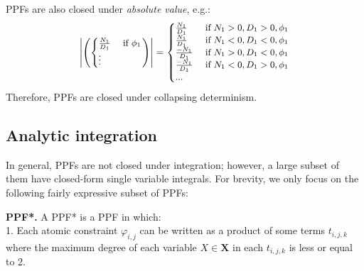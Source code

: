 \documentclass[]{article}
\newcommand{\bvec}[1]{\textbf{#1}}
\newcommand{\case}[2]{#2 &\text{ if } #1}%
\begin{document}
PPFs are also closed under \emph{absolute value}, e.g.:
\begin{equation*}\footnotesize
\left|
\left(
  \begin{cases}
  \case{\phi_1}{\frac{N_1}{D_1}}\\
  \vdots
  \end{cases}
\right)
\right|
=
  \begin{cases}
  \case{N_1>0, D_1>0,\phi_1}{\frac{N_1}{D_1}} \\
\case{N_1<0, D_1<0,\phi_1}{\frac{N_1}{D_1}} \\
\case{N_1>0, D_1<0,\phi_1}{\frac{-N_1}{D_1}} \\
\case{N_1<0, D_1>0,\phi_1}{\frac{-N_1}{D_1}} \\
...
 \end{cases}
\end{equation*}
Therefore, %
PPFs are closed under %
collapsing determinism. %


\subsection{Analytic integration}
In general, PPFs are not closed under integration; however, a large subset of them 
 have closed-form single variable integrals.
For brevity, we only focus on the following fairly expressive  subset of PPFs:

\textbf{PPF*. }
A PPF* is a PPF in which:\\ %
1. Each atomic constraint $\varphi_{i,j}$
can be written as a product of some terms $t_{i,j,k}$ where the maximum degree of each variable $X \in \bvec{X}$ in each $t_{i,j,k}$ is less or equal to 2.\\ %
\end{document}
